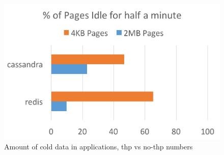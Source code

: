 %
\begin{figure}[t]
\centering
\includegraphics[width=1.0\columnwidth]{thermostat/figures/cold-data.png}
\caption{Amount of cold data in applications, thp vs no-thp numbers}
\vspace{-0.175in}
\label{fig:motivation-thermostat}
\end{figure}

